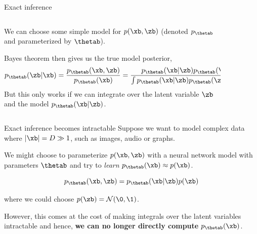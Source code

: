 \begin{frame}{Exact inference}
    \begin{columns}
        \begin{column}{0.7\textwidth}
            We can choose some simple model for $p(\xb,\zb)$ (denoted $p_\thetab$ and parameterized by $\thetab$).
            \vspace{3mm}
            
            Bayes theorem then gives us the true model posterior,
            \begin{equation}
                p_\thetab(\zb|\xb) = \frac{p_\thetab(\xb,\zb)}{p_\thetab(\xb)} = \frac{p_\thetab(\xb|\zb)p_\thetab(\zb)}{\int p_\thetab(\xb|\zb)p_\thetab(\zb) \text{d}\zb}.
            \end{equation}
            But this only works if we can integrate over the latent variable $\zb$ and the model $p_\thetab(\xb|\zb)$.
        \end{column}
        \begin{column}{.3\textwidth}
            \begin{figure}[\textwidth]
            \end{figure}
        \end{column}
    \end{columns}
\end{frame}


\begin{frame}{Exact inference becomes intractable}
    Suppose we want to model complex data where $\vert\xb\vert = D \gg 1$, such as images, audio or graphs.
    \vspace{3mm}

    We might choose to parameterize $p(\xb,\zb)$ with a neural network model with parameters $\thetab$ and try to \textit{learn} $p_\thetab(\xb) \approx p(\xb)$.

    \begin{equation}
        p_\thetab(\xb, \zb) = p_\thetab(\xb|\zb)p(\zb)
    \end{equation}
    
    where we could choose $p(\zb)=\mathcal{N}(\0,\1)$.
    \vspace{3mm}

    However, this comes at the cost of making integrals over the latent variables intractable and hence, \textbf{we can no longer directly compute} $p_\thetab(\xb)$.
\end{frame}


